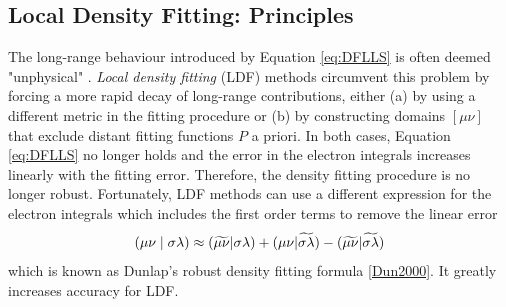 \subsection{Local Density Fitting: Principles} 
The long-range behaviour introduced by Equation \ref{eq:DFLLS} is often deemed "unphysical" \cite{Tew2018}. \emph{Local density fitting} (LDF) methods circumvent this problem by forcing a more rapid decay of long-range contributions, either (a) by using a different metric in the fitting procedure or (b) by constructing domains $[\mu\nu]$ that exclude distant fitting functions $P$ a priori. In both cases, Equation \ref{eq:DFLLS} no longer holds and the error in the electron integrals increases linearly with the fitting error. Therefore, the density fitting procedure is no longer robust. Fortunately, LDF methods can use a different expression for the electron integrals which includes the first order terms to remove the linear error
\begin{equation}
\left( \mu\nu \mid \sigma\lambda \right) \approx (\widetilde{\mu\nu}|\sigma\lambda) + (\mu\nu|\widetilde{\sigma\lambda}) - (\widetilde{\mu\nu}|\widetilde{\sigma\lambda})
\label{eq:DUNLAP}
\end{equation}
\noindent which is known as Dunlap's robust density fitting formula \ref{Dun2000}. It greatly increases accuracy for LDF. 
 
